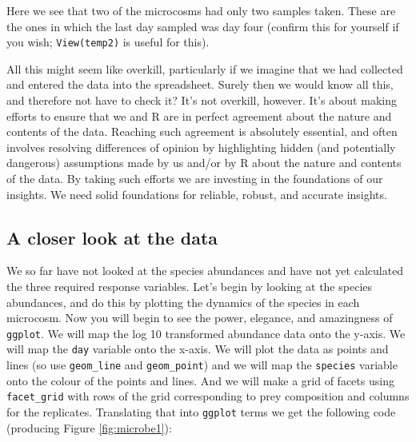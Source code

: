 \documentclass[]{book}
\newenvironment{Shaded}{\begin{snugshade}}{\end{snugshade}}
\newcommand{\DataTypeTok}[1]{\textcolor[rgb]{0.13,0.29,0.53}{#1}}
\newcommand{\KeywordTok}[1]{\textcolor[rgb]{0.13,0.29,0.53}{\textbf{#1}}}
\newcommand{\NormalTok}[1]{#1}
\newcommand{\OperatorTok}[1]{\textcolor[rgb]{0.81,0.36,0.00}{\textbf{#1}}}
\newcommand{\StringTok}[1]{\textcolor[rgb]{0.31,0.60,0.02}{#1}}
\begin{document}
Here we see that two of the microcosms had only two samples taken. These are the ones in which the last day sampled was day four (confirm this for yourself if you wish; \texttt{View(temp2)} is useful for this).

\begin{safety}
All this might seem like overkill, particularly if we imagine that we
had collected and entered the data into the spreadsheet. Surely then we
would know all this, and therefore not have to check it? It's not
overkill, however. It's about making efforts to ensure that we and R are
in perfect agreement about the nature and contents of the data. Reaching
such agreement is absolutely essential, and often involves resolving
differences of opinion by highlighting hidden (and potentially
dangerous) assumptions made by us and/or by R about the nature and
contents of the data. By taking such efforts we are investing in the
foundations of our insights. We need solid foundations for reliable,
robust, and accurate insights.
\end{safety}

\hypertarget{a-closer-look-at-the-data}{%
\subsection{A closer look at the data}\label{a-closer-look-at-the-data}}

We so far have not looked at the species abundances and have not yet calculated the three required response variables. Let's begin by looking at the species abundances, and do this by plotting the dynamics of the species in each microcosm. Now you will begin to see the power, elegance, and amazingness of \texttt{ggplot}. We will map the log 10 transformed abundance data onto the y-axis. We will map the \texttt{day} variable onto the x-axis. We will plot the data as points and lines (so use \texttt{geom\_line} and \texttt{geom\_point}) and we will map the \texttt{species} variable onto the colour of the points and lines. And we will make a grid of facets using \texttt{facet\_grid} with rows of the grid corresponding to prey composition and columns for the replicates. Translating that into \texttt{ggplot} terms we get the following code (producing Figure \ref{fig:microbe1}):

\begin{Shaded}
\end{Shaded}
\end{document}
